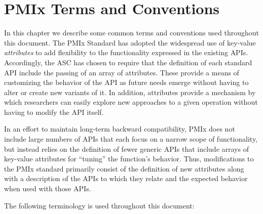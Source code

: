 \chapter{PMIx Terms and Conventions}
\label{chap:terms}

In this chapter we describe some common terms and conventions used throughout
this document. The \ac{PMIx} Standard has adopted the widespread use of
key-value \textit{attributes} to add flexibility to the functionality expressed
in the existing \acp{API}. Accordingly, the \ac{ASC} has chosen to require that
the definition of each standard \ac{API} include the passing of an array of
attributes. These provide a means of customizing the behavior of the \ac{API}
as future needs emerge without having to alter or create new variants of it. In
addition, attributes provide a mechanism by which researchers can easily
explore new approaches to a given operation without having to modify the
\ac{API} itself.

In an effort to maintain long-term backward compatibility, \ac{PMIx} does not include large numbers of \acp{API} that each focus on a narrow scope of functionality, but instead relies on the definition of fewer generic \acp{API} that include arrays of key-value attributes for ``tuning'' the function's behavior. Thus, modifications to the \ac{PMIx} standard primarily consist of the definition of new attributes along with a description of the \acp{API} to which they relate and the expected behavior when used with those \acp{API}.

The following terminology is used throughout this document:


